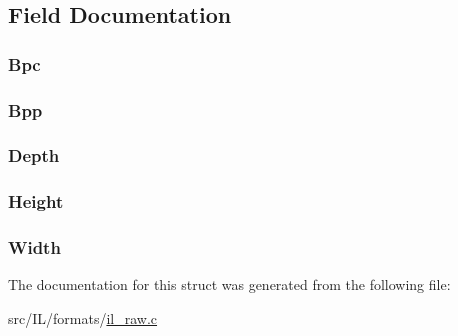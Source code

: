 \subsection{Field Documentation}
\hypertarget{struct_r_a_w___h_e_a_d_a77cd917981bd92ddb76c5108db5993e8}{
\subsubsection[{Bpc}]{ Bpc}}\label{struct_r_a_w___h_e_a_d_a77cd917981bd92ddb76c5108db5993e8}
\hypertarget{struct_r_a_w___h_e_a_d_acb619433784a0e26c0f1f18b3700c9f7}{
\subsubsection[{Bpp}]{ Bpp}}\label{struct_r_a_w___h_e_a_d_acb619433784a0e26c0f1f18b3700c9f7}
\hypertarget{struct_r_a_w___h_e_a_d_a2a4c47a9713bee335a0830b336bdc951}{
\subsubsection[{Depth}]{ Depth}}\label{struct_r_a_w___h_e_a_d_a2a4c47a9713bee335a0830b336bdc951}
\hypertarget{struct_r_a_w___h_e_a_d_a8a8093d76b61a95fc96df24af29b107a}{
\subsubsection[{Height}]{ Height}}\label{struct_r_a_w___h_e_a_d_a8a8093d76b61a95fc96df24af29b107a}
\hypertarget{struct_r_a_w___h_e_a_d_a4146e7b2b0b4097e0e335f9b348392bf}{
\subsubsection[{Width}]{ Width}}\label{struct_r_a_w___h_e_a_d_a4146e7b2b0b4097e0e335f9b348392bf}


The documentation for this struct was generated from the following file\-:\begin{DoxyCompactItemize}
\item 
src/\-I\-L/formats/\hyperlink{il__raw_8c}{il\-\_\-raw.\-c}\end{DoxyCompactItemize}
